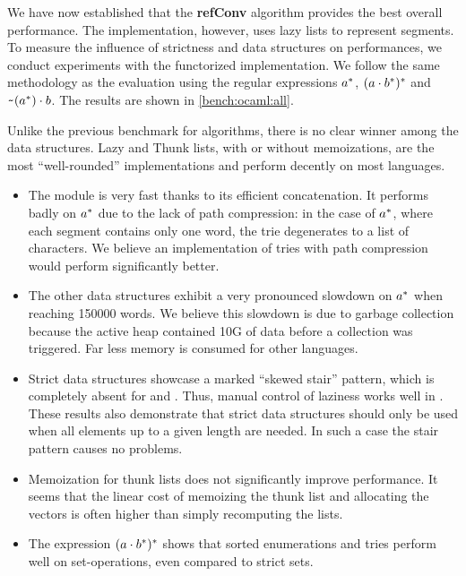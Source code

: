 We have now established that the \textbf{refConv} algorithm
provides the best overall performance.  The \haskell implementation,
however, uses lazy lists to represent segments.
To measure the influence of strictness and data structures on
performances, we conduct experiments with the functorized \ocaml implementation.
We follow the same methodology as the \haskell evaluation using the
regular expressions $a^*$, $(a \cdot{b^*})^*$ and
$\texttt{\textasciitilde}{(a^*)} \cdot{b}$.  The results are shown in
\cref{bench:ocaml:all}.

Unlike the previous benchmark for algorithms, there is no clear winner
among the data structures.
Lazy and Thunk lists, with or without memoizations, are the most ``well-rounded''
implementations and perform decently on most languages.
\begin{itemize}[leftmargin=*]
\item The  module
  is very fast thanks to its efficient concatenation.
  It performs badly on $a^*$
  due to the lack of path compression:
  in the case of $a^*$, where each segment contains only one word, the
  trie degenerates to a list of characters.
  We believe an implementation of tries with path compression would perform
  significantly better.
\item The other data structures exhibit a very pronounced slowdown on $a^*$
  when reaching 150000 words.
  We believe this slowdown is due to garbage collection because
  the active heap contained 10G of data before
  a collection was triggered. Far less memory is consumed for other languages.
\item Strict data structures showcase a marked ``skewed
  stair'' pattern, which is completely absent for  and
  . Thus, manual control of laziness works well in
  \ocaml. These results also demonstrate that strict data structures
  should only be used when all elements up to a given length are
  needed. In such a case the stair pattern causes no problems.
\item Memoization for thunk lists does not significantly improve performance.
  It seems that the linear cost of memoizing the thunk list and
  allocating the vectors
  is often higher than simply recomputing the lists.
\item The expression $(a \cdot{b^*})^*$ shows that sorted enumerations and tries
  perform well on set-operations, even compared to strict sets.
\end{itemize}

